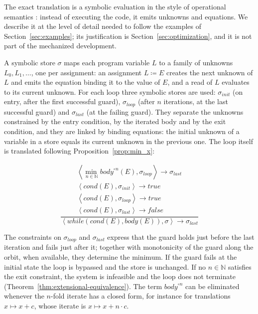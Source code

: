 \documentclass[oneside,english]{amsart}
\numberwithin{equation}{section}
\numberwithin{figure}{section}
\theoremstyle{plain}
\theoremstyle{definition}
\theoremstyle{plain}
\theoremstyle{remark}
\theoremstyle{plain}
\theoremstyle{definition}
\theoremstyle{plain}
\theoremstyle{remark}
\begin{document}
The exact translation is a symbolic evaluation in the style of operational semantics \cite{winskel1993formal}: instead of executing the code, it emits unknowns and equations. We describe it at the level of detail needed to follow the examples of Section~\ref{sec:examples}; its justification is Section~\ref{sec:optimization}, and it is not part of the mechanized development.

A symbolic store $\sigma$ maps each program variable $L$ to a family of unknowns $L_0, L_1, \dots$, one per assignment: an assignment $L \coloneqq E$ creates the next unknown of $L$ and emits the equation binding it to the value of $E$, and a read of $L$ evaluates to its current unknown. For each loop three symbolic stores are used: $\sigma_{init}$ (on entry, after the first successful guard), $\sigma_{loop}$ (after $n$ iterations, at the last successful guard) and $\sigma_{last}$ (at the failing guard). They separate the unknowns constrained by the entry condition, by the iterated body and by the exit condition, and they are linked by binding equations: the initial unknown of a variable in a store equals its current unknown in the previous one. The loop itself is translated following Proposition~\ref{prop:min_x}:

\[
\frac{\begin{array}{c}
\left\langle \underset{n\in\mathbb{N}}{\min\,}\mathit{body}^{\circ n}(E),\sigma_{loop}\right\rangle \rightarrow\sigma_{last}\\
\left\langle \mathit{cond}(E),\sigma_{init}\right\rangle \rightarrow \mathit{true}\\
\left\langle \mathit{cond}(E),\sigma_{loop}\right\rangle \rightarrow \mathit{true}\\
\left\langle \mathit{cond}(E),\sigma_{last}\right\rangle \rightarrow \mathit{false}
\end{array}}{\left\langle \mathit{while}(\mathit{cond}(E),\mathit{body}(E)),\sigma\right\rangle \rightarrow\sigma_{last}}
\]

The constraints on $\sigma_{loop}$ and $\sigma_{last}$ express that the guard holds just before the last iteration and fails just after it; together with monotonicity of the guard along the orbit, when available, they determine the minimum. If the guard fails at the initial state the loop is bypassed and the store is unchanged. If no $n \in \mathbb{N}$ satisfies the exit constraint, the system is infeasible and the loop does not terminate (Theorem~\ref{thm:extensional-equivalence}). The term $\mathit{body}^{\circ n}$ can be eliminated whenever the $n$-fold iterate has a closed form, for instance for translations $x \mapsto x + c$, whose iterate is $x \mapsto x + n \cdot c$.
\end{document}
